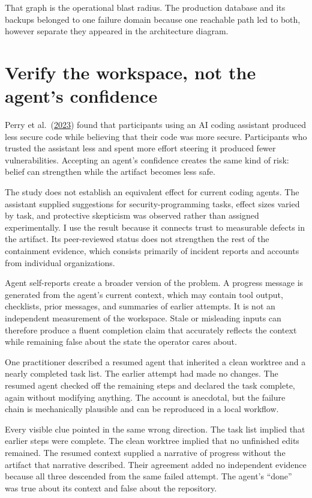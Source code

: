 That graph is the operational blast radius. The production database and its backups belonged to one failure domain because one reachable path led to both, however separate they appeared in the architecture diagram.

\section{Verify the workspace, not the agent's confidence}\label{verify-the-workspace-not-the-agents-confidence}

Perry et al.~(\href{https://arxiv.org/abs/2211.03622}{2023}) found that participants using an AI coding assistant produced less secure code while believing that their code was more secure. Participants who trusted the assistant less and spent more effort steering it produced fewer vulnerabilities. Accepting an agent's confidence creates the same kind of risk: belief can strengthen while the artifact becomes less safe.

The study does not establish an equivalent effect for current coding agents. The assistant supplied suggestions for security-programming tasks, effect sizes varied by task, and protective skepticism was observed rather than assigned experimentally. I use the result because it connects trust to measurable defects in the artifact. Its peer-reviewed status does not strengthen the rest of the containment evidence, which consists primarily of incident reports and accounts from individual organizations.

Agent self-reports create a broader version of the problem. A progress message is generated from the agent's current context, which may contain tool output, checklists, prior messages, and summaries of earlier attempts. It is not an independent measurement of the workspace. Stale or misleading inputs can therefore produce a fluent completion claim that accurately reflects the context while remaining false about the state the operator cares about.

One practitioner described a resumed agent that inherited a clean worktree and a nearly completed task list. The earlier attempt had made no changes. The resumed agent checked off the remaining steps and declared the task complete, again without modifying anything. The account is anecdotal, but the failure chain is mechanically plausible and can be reproduced in a local workflow.

Every visible clue pointed in the same wrong direction. The task list implied that earlier steps were complete. The clean worktree implied that no unfinished edits remained. The resumed context supplied a narrative of progress without the artifact that narrative described. Their agreement added no independent evidence because all three descended from the same failed attempt. The agent's ``done'' was true about its context and false about the repository.

